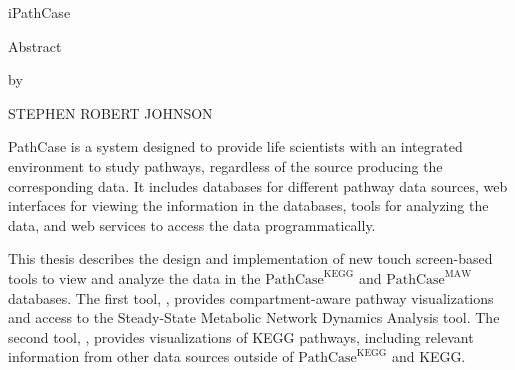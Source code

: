 \newcommand{\pathcasekegg}{ $\mathrm{PathCase}^\mathrm{KEGG}$ }
\newcommand{\pathcasemaw}{ $\mathrm{PathCase}^\mathrm{MAW}$ }
\newcommand{\pathcasesb}{ $\mathrm{PathCase}^\mathrm{SB}$ }
\newcommand{\boldpathcasekegg}{ $\mathbf{PathCase}^\mathbf{KEGG}$ }
\newcommand{\boldpathcasemaw}{ $\mathbf{PathCase}^\mathbf{MAW}$ }

\begin{center}
    iPathCase

    Abstract

    by

    STEPHEN ROBERT JOHNSON
\end{center}

PathCase is a system designed to provide life scientists with an integrated
environment to study pathways, regardless of the source producing the
corresponding data. It includes databases for different pathway data sources,
web interfaces for viewing the information in the databases, tools for analyzing
the data, and web services to access the data programmatically.

This thesis describes the design and implementation of new touch screen-based
tools to view and analyze the data in the \pathcasekegg and \pathcasemaw
databases. The first tool, \mawapp, provides compartment-aware pathway
visualizations and access to the Steady-State Metabolic Network Dynamics
Analysis tool. The second tool, \keggapp, provides visualizations of KEGG
pathways, including relevant information from other data sources outside of
\pathcasekegg and KEGG.

